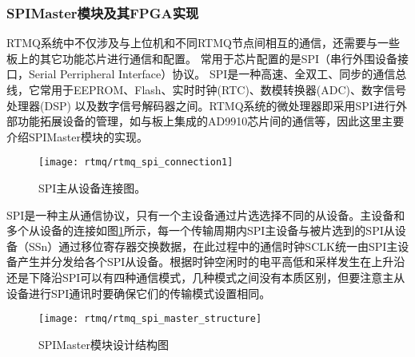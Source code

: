 \subsubsection[SPIMaster模块及其FPGA实现]{SPIMaster模块及其FPGA实现}

RTMQ系统中不仅涉及与上位机和不同RTMQ节点间相互的通信，还需要与一些板上的其它功能芯片进行通信和配置。
常用于芯片配置的是SPI（串行外围设备接口，Serial Perripheral Interface）协议。
SPI是一种高速、全双工、同步的通信总线，它常用于EEPROM、Flash、实时时钟(RTC)、数模转换器(ADC)、数字信号处理器(DSP) 以及数字信号解码器之间。RTMQ系统的微处理器即采用SPI进行外部功能拓展设备的管理，如与板上集成的AD9910芯片间的通信等，因此这里主要介绍SPIMaster模块的实现。

\begin{figure}
    \centering
    \texttt{[image: rtmq/rtmq\_spi\_connection1]}
    \caption[SPI主从设备连接图]{SPI主从设备连接图。\label{fig:rtmq_spi_connection1}}
\end{figure}

SPI是一种主从通信协议，只有一个主设备通过片选选择不同的从设备。主设备和多个从设备的连接如图\ref{fig:rtmq_spi_connection1}所示，每一个传输周期内SPI主设备与被片选到的SPI从设备（SSn）通过移位寄存器交换数据，在此过程中的通信时钟SCLK统一由SPI主设备产生并分发给各个SPI从设备。根据时钟空闲时的电平高低和采样发生在上升沿还是下降沿SPI可以有四种通信模式，几种模式之间没有本质区别，但要注意主从设备进行SPI通讯时要确保它们的传输模式设置相同。

\begin{figure}
    \centering
    \texttt{[image: rtmq/rtmq\_spi\_master\_structure]}
    \caption[SPIMaster模块设计结构图]{SPIMaster模块设计结构图\label{fig:rtmq_spi_master_structure}}
\end{figure}

